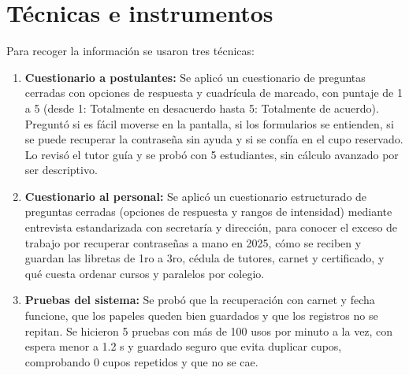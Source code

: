\section{Técnicas e instrumentos}
\label{sec:tecnicas_instrumentos}

Para recoger la información se usaron tres técnicas:

\begin{enumerate}
    \item \textbf{Cuestionario a postulantes:} Se aplicó un cuestionario de preguntas cerradas con opciones de respuesta y cuadrícula de marcado, con puntaje de 1 a 5 (desde 1: Totalmente en desacuerdo hasta 5: Totalmente de acuerdo). Preguntó si es fácil moverse en la pantalla, si los formularios se entienden, si se puede recuperar la contraseña sin ayuda y si se confía en el cupo reservado. Lo revisó el tutor guía y se probó con 5 estudiantes, sin cálculo avanzado por ser descriptivo.
    \item \textbf{Cuestionario al personal:} Se aplicó un cuestionario estructurado de preguntas cerradas (opciones de respuesta y rangos de intensidad) mediante entrevista estandarizada con secretaría y dirección, para conocer el exceso de trabajo por recuperar contraseñas a mano en 2025, cómo se reciben y guardan las libretas de 1ro a 3ro, cédula de tutores, carnet y certificado, y qué cuesta ordenar cursos y paralelos por colegio.
    \item \textbf{Pruebas del sistema:} Se probó que la recuperación con carnet y fecha funcione, que los papeles queden bien guardados y que los registros no se repitan. Se hicieron 5 pruebas con más de 100 usos por minuto a la vez, con espera menor a 1.2 s y guardado seguro que evita duplicar cupos, comprobando 0 cupos repetidos y que no se cae.
\end{enumerate}
